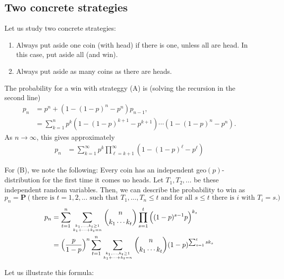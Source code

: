 \documentclass{article}
\theoremstyle{definition}
\theoremstyle{step} \newtheorem{step}{Step}
\begin{document}
\subsection*{Two concrete strategies}
Let us study two concrete strategies:
\begin{enumerate}
  \item[(A)] Always put aside one coin (with head) if there is one,
    unless all are head. In this case, put aside all (and win).
  \item[(B)] Always put aside as many coins as there are heads.
\end{enumerate}
The probability for a win with strateggy (A) is (solving the recursion in the second line)
\begin{align*}
  p_n & = p^n + (1 - (1-p)^n - p^n)p_{n-1}, \\ & = \sum_{k=1}^n
  p^k (1 - (1-p)^{k+1} - p^{k+1}) \cdots (1 - (1-p)^n - p^n).
\end{align*}
As $n\to\infty$, this gives approximately
\begin{align*}
  p_n & = \sum_{k=1}^\infty p^k \prod_{\ell = k+1}^\infty (1 -
  (1-p)^\ell - p^\ell)
\end{align*}

For (B), we note the following: Every coin has an independent
geo$(p)$-distribution for the first time it comes uo heads. Let $T_1,
T_2,...$ be these independent random variables. Then, we can describe
the probability to win as
$$ p_n = \mathbf P(\text{there is $t=1,2,...$ such that $T_1,...,T_n
  \leq t$ and for all $s\leq t$ there is $i$ with $T_i=s$}).$$
\begin{align*}
  p_n & = \sum_{t=1}^n \sum_{k_1,...,k_t \geq 1 \atop k_1 + \cdots + k_t
    = n} \binom{n}{k_1 \cdots k_t} \prod_{s=1}^t \Big((1-p)^{s-1}p\Big)^{k_s}
  \\ & = \Big( \frac{p}{1-p}\Big)^n \sum_{t=1}^n \sum_{k_1,...,k_t \geq 1 \atop k_1 + \cdots + k_t
    = n} \binom{n}{k_1 \cdots k_t} (1-p)^{\sum_{s=1}^t s k_s}
\end{align*}

Let us illustrate this formula:

~~
\end{document}
